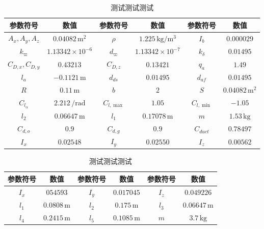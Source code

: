 \begin{table}
	\caption{\label{DF_para1}测试测试测试}
	\centering{}%
	\small 
	\begin{tabular}{cccccc}
		\hline 
		参数符号 & 数值&参数符号 & 数值&参数符号 & 数值\tabularnewline
		\hline 
		$ A_x,A_y,A_z $  & $ 0.04082\,\text{m}^2 $ &$ \rho $        &$1.225\,\text{kg}/\text{m}^3$&$ I_b $           & $ 0.000029 $               \tabularnewline
		$ k_{\varpi} $   & $1.13342 \times 10^{-6}$& $ d_{\varpi} $ & $1.13342 \times 10^{-7}$ 	  &$k_{\delta} $     & $ 0.01495 $ 			      \tabularnewline
		$C_{D,x},C_{D,y}$& $ 0.43213 $             &$ C_{D,z} $     & $ 0.13421 $             	  &	$ q_a $ 	     & $ 1.49 $ 				  \tabularnewline
		$ l_{a} $        & $ -0.1121\,\text{m} $   & $ d_{ds} $     & $ 0.01495 $			  	  &$ d_{af} $        & $ 0.01495 $    			  \tabularnewline
		$ R $            & $ 0.11\,\text{m} $      &$ b $           & $ 2 $       			   	  &$ S $ 			 & $ 0.04082\,\text{m}^2 $    \tabularnewline
		$C_{l_{\alpha}}$ & $ 2.212\,/\text{rad} $  &$C_{l, \max } $ & $ 1.05 $ 				   	  &$ C_{l, \min } $  & $ -1.05 $ 				  \tabularnewline
		$ l_2 $          & $ 0.06647\,\text{m} $   &$ l_1 $         & $ 0.17078\,\text{m} $    	  &	$ m $ 		     & $ 1.53\,\text{kg} $ 		  \tabularnewline
		$ C_{d, o } $    & $ 0.9 $                 &$ C_{d, g } $   & $ 0.9 $					  &$ C_{duct} $      & $ 0.78497 $	 			  \tabularnewline
		$ I_x $          & $ 0.02548 $ 			   &$ I_y $         & $ 0.02550 $                 &$ I_z $			 & $ 0.00562 $ 				  \tabularnewline
		\hline 
	\end{tabular}	
\end{table}

\begin{table}
	\caption{\label{TDF_para2}测试测试测试}
	\centering{}%
	\small 
	\begin{tabular}{cccccc}
		\hline 
		参数符号 & 数值&参数符号 & 数值&参数符号 & 数值\tabularnewline
		\hline 
		$ I_x $ & $ 054593 $ &$ I_y $ & $ 0.017045 $& $ I_z$ & $ 0.049226 $ \tabularnewline
		$ l_{1} $ & $ 0.0808\,\text{m} $&$ l_{2} $ & $ 0.175\,\text{m} $ &$ l_3 $ & $ 0.06647\,\text{m} $ \tabularnewline 
		$ l_4 $ & $ 0.2415\,\text{m} $ &$ l_5 $ & $ 0.1085\,\text{m} $& $ m $ & $ 3.7\,\text{kg} $ \tabularnewline
		\hline 
	\end{tabular}	%
\end{table}